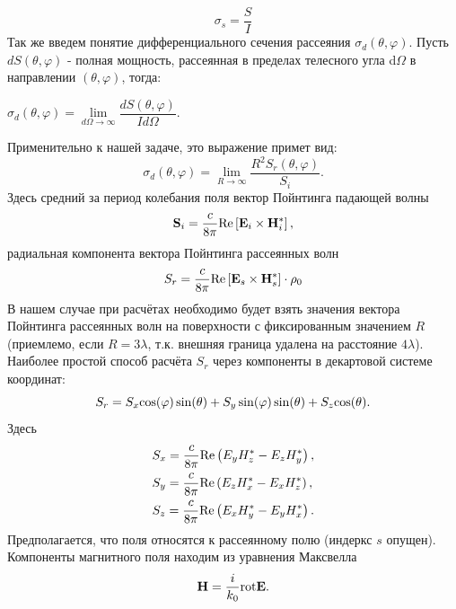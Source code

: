\begin{equation}
	\sigma_s = \dfrac{S}{I} 
\end{equation}
Так же введем понятие дифференциального сечения рассеяния
 $ \sigma_d(\theta,\varphi) $. Пусть $ dS(\theta, \varphi) $ - полная мощность, рассеянная в пределах телесного угла d$ \Omega $ в направлении $ (\theta,\varphi) $, тогда:
 \begin{center}
 	$ \sigma_d(\theta,\varphi) = \lim\limits_{d\Omega\rightarrow\infty} \dfrac{dS(\theta, \varphi)}{Id\Omega}. $
 \end{center}
Применительно к нашей задаче, это выражение примет вид:
\begin{equation}
\sigma_d(\theta,\varphi) = \lim\limits_{R\rightarrow\infty} \dfrac{R^2 S_r(\theta, \varphi)}{S_i}.
\end{equation}
Здесь средний за период колебания поля вектор Пойнтинга падающей волны
\begin{equation}
{\vec S}_i = \dfrac{c}{8\pi} {\rm Re} \left[{\vec E}_i \times {\vec H}^*_i\right],
\end{equation}
радиальная компонента вектора Пойнтинга рассеянных волн
\begin{equation}
{S}_r = \dfrac{c}{8\pi} {\rm Re} \left[{\vec E}_s \times {\vec H}^*_s\right] \cdot {\vec \rho}_0
\end{equation}
В нашем случае при расчётах необходимо будет взять значения вектора Пойнтинга рассеянных волн на поверхности с фиксированным значением $R$ (приемлемо, если $R=3\lambda$, т.к. внешняя граница удалена на расстояние $4\lambda$).\\
Наиболее простой способ расчёта $S_r$ через компоненты в декартовой системе координат:
\begin{equation}
{S}_r = S_x {\rm cos}(\varphi)\sin(\theta) + S_y \sin(\varphi)\sin(\theta) + S_z {\rm cos}(\theta).
\end{equation}
Здесь
\begin{eqnarray}
& S_x = \dfrac{c}{8\pi} {\rm Re} \left(E_y H_z^* - E_z H_y^*\right),\nonumber\\
& S_y = \dfrac{c}{8\pi} {\rm Re} \left(E_z H_x^* - E_x H_z^*\right),\nonumber\\ & S_z = \dfrac{c}{8\pi} {\rm Re} \left(E_x H_y^* - E_y H_x^*\right).
\end{eqnarray}
Предполагается, что поля относятся к рассеянному полю (индеркс $s$ опущен).
Компоненты магнитного поля находим из уравнения Максвелла
\begin{equation}
{\vec H} = \dfrac{i}{k_0} {\rm \rm rot} \vec{E}.
\end{equation}

